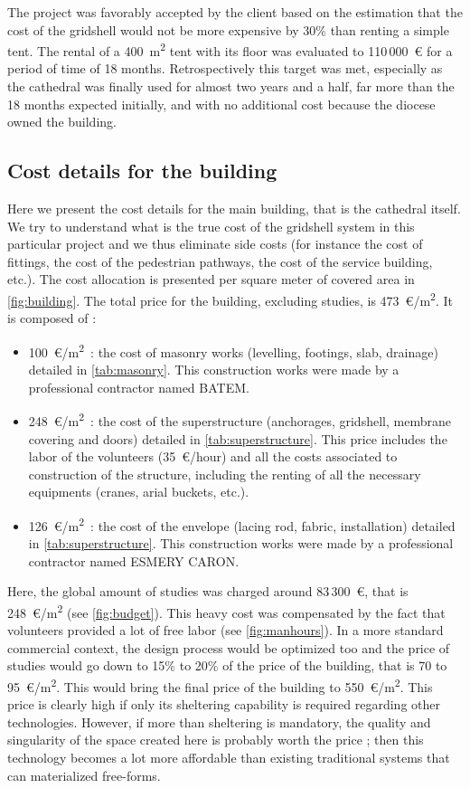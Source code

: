 The project was favorably accepted by the client based on the estimation that the cost of the gridshell would not be more expensive by 30\% than renting a simple tent. The rental of a 400~m\textsuperscript{2} tent with its floor was evaluated to 110\,000~€ for a period of time of 18 months. Retrospectively this target was met, especially as the cathedral was finally used for almost two years and a half, far more than the 18 months expected initially, and with no additional cost because the diocese owned the building.

\subsection{Cost details for the building}\label{sec=gs_cost}
Here we present the cost details for the main building, that is the cathedral itself. We try to understand what is the true cost of the gridshell system in this particular project and we thus eliminate side costs (for instance the cost of fittings, the cost of the pedestrian pathways, the cost of the service building, etc.). The cost allocation is presented per square meter of covered area in \cref{fig:building}. The total price for the building, excluding studies, is 473~€/m\textsuperscript{2}. It is composed of :
\begin{itemize}
\item  100~€/m\textsuperscript{2}~: the cost of masonry works (levelling, footings, slab, drainage) detailed in \cref{tab:masonry}. This construction works were made by a professional contractor named BATEM.
\item  248~€/m\textsuperscript{2}~: the cost of the superstructure (anchorages, gridshell, membrane covering and doors) detailed in \cref{tab:superstructure}. This price includes the labor of the volunteers (35~€/hour) and all the costs associated to construction of the structure, including the renting of all the necessary equipments (cranes, arial buckets, etc.).
\item  126~€/m\textsuperscript{2}~: the cost of the envelope (lacing rod, fabric, installation) detailed in \cref{tab:superstructure}. This construction works were made by a professional contractor named ESMERY CARON.
\end{itemize}

Here, the global amount of studies was charged around 83\,300~€, that is 248~€/m\textsuperscript{2} (see \cref{fig:budget}). This heavy cost was compensated by the fact that volunteers provided a lot of free labor (see \cref{fig:manhours}). In a more standard commercial context, the design process would be optimized too and the price of studies would go down to 15\% to 20\% of the price of the building, that is 70 to 95~€/m\textsuperscript{2}. This would bring the final price of the building to 550~€/m\textsuperscript{2}. This price is clearly high if only its sheltering capability is required regarding other technologies. However, if more than sheltering is mandatory, the quality and singularity of the space created here is probably worth the price ; then this technology becomes a lot more affordable than existing traditional systems that can materialized free-forms.


